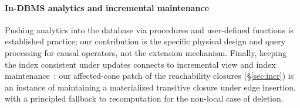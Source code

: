 \paragraph{In-DBMS analytics and incremental maintenance}
Pushing analytics into the database via procedures and user-defined functions is
established practice; our contribution is the specific physical design and query
processing for causal operators, not the extension mechanism. Finally, keeping the
index consistent under updates connects to incremental view and index
maintenance~\cite{TODO_ivm}: our affected-cone patch of the reachability closures
(\S\ref{sec:incr}) is an instance of maintaining a materialized transitive
closure under edge insertion, with a principled fallback to recomputation for the
non-local case of deletion.
